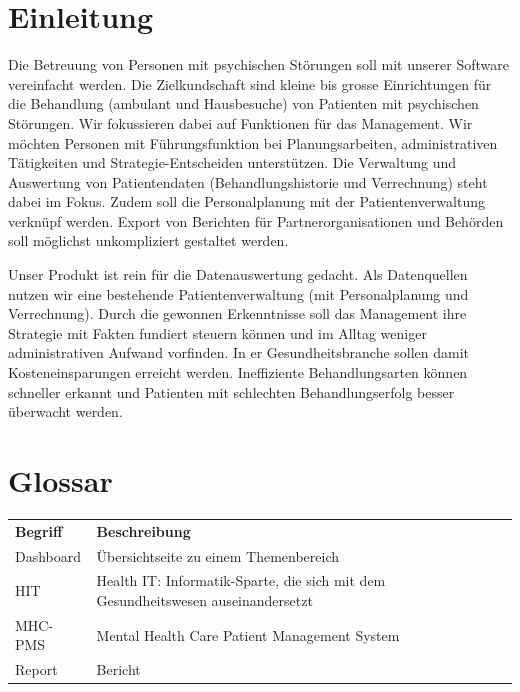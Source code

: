 \documentclass[a4paper]{scrreprt}
\begin{document}
\chapter{Einleitung}

Die Betreuung von Personen mit psychischen Störungen soll mit unserer Software vereinfacht werden. Die Zielkundschaft sind kleine bis grosse Einrichtungen für die Behandlung (ambulant und Hausbesuche) von Patienten mit psychischen Störungen. Wir fokussieren dabei auf Funktionen für das Management. Wir möchten Personen mit Führungsfunktion bei Planungsarbeiten, administrativen Tätigkeiten und Strategie-Entscheiden unterstützen. Die Verwaltung und Auswertung von Patientendaten (Behandlungshistorie und Verrechnung) steht dabei im Fokus. Zudem soll die Personalplanung mit der Patientenverwaltung verknüpf werden. Export von Berichten für Partnerorganisationen und Behörden soll möglichst unkompliziert gestaltet werden.

\bigskip

Unser Produkt ist rein für die Datenauswertung gedacht. Als Datenquellen nutzen wir eine bestehende Patientenverwaltung (mit Personalplanung und Verrechnung). Durch die gewonnen Erkenntnisse soll das Management ihre Strategie mit Fakten fundiert steuern können und im Alltag weniger administrativen Aufwand vorfinden. In er Gesundheitsbranche sollen damit Kosteneinsparungen erreicht werden. Ineffiziente Behandlungsarten können schneller erkannt und Patienten mit schlechten Behandlungserfolg besser überwacht werden.



\chapter{Glossar}
\begin{table}[h]
\label{tab_glossar}
\begin{tabular}{llll}
{\bf Begriff} 		& {\bf Beschreibung} \\
Dashboard			& Übersichtseite zu einem Themenbereich \\

HIT 				& Health IT: Informatik-Sparte, die sich mit dem Gesundheitswesen auseinandersetzt \\

MHC-PMS 			& Mental Health Care Patient Management System \\
Report				& Bericht


\end{tabular}
\end{table}
\end{document}
